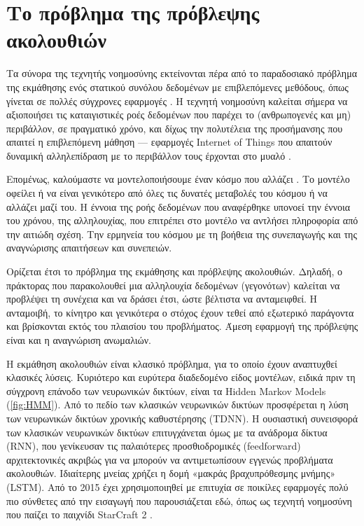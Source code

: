 \section{Το πρόβλημα της πρόβλεψης ακολουθιών}

	Τα σύνορα της τεχνητής νοημοσύνης εκτείνονται πέρα από το παραδοσιακό πρόβλημα της εκμάθησης ενός στατικού συνόλου δεδομένων με επιβλεπόμενες μεθόδους,
	όπως γίνεται σε πολλές σύγχρονες εφαρμογές \parencite{lecun}.
	Η τεχνητή νοημοσύνη καλείται σήμερα να αξιοποιήσει τις καταιγιστικές ροές δεδομένων που παρέχει το (ανθρωπογενές και μη) περιβάλλον, σε πραγματικό χρόνο,
	και δίχως την πολυτέλεια της προσήμανσης που απαιτεί η επιβλεπόμενη μάθηση ---
	εφαρμογές Internet of Things που απαιτούν δυναμική αλληλεπίδραση με το περιβάλλον τους έρχονται στο μυαλό \parencite{mohammadiDeepLearningIoT2018}.

	Επομένως, καλούμαστε να μοντελοποιήσουμε έναν κόσμο που αλλάζει \parencite{staticbottleneck}.
	Το μοντέλο οφείλει ή να είναι γενικότερο από όλες τις δυνατές μεταβολές του κόσμου ή να αλλάζει μαζί του.
	Η έννοια της ροής δεδομένων που αναφέρθηκε υπονοεί την έννοια του χρόνου, της αλληλουχίας, που επιτρέπει στο μοντέλο να αντλήσει πληροφορία από την αιτιώδη σχέση.
	Την ερμηνεία του κόσμου με τη βοήθεια της συνεπαγωγής και της αναγνώρισης απαιτήσεων και συνεπειών.

	Ορίζεται έτσι το πρόβλημα της εκμάθησης και πρόβλεψης ακολουθιών.
	Δηλαδή, ο πράκτορας που παρακολουθεί μια αλληλουχία δεδομένων (γεγονότων) καλείται να προβλέψει τη συνέχεια και να δράσει έτσι, ώστε βέλτιστα να ανταμειφθεί.
	Η ανταμοιβή, το κίνητρο και γενικότερα ο στόχος έχουν τεθεί από εξωτερικό παράγοντα και βρίσκονται εκτός του πλαισίου του προβλήματος.
	Άμεση εφαρμογή της πρόβλεψης είναι και η αναγνώριση ανωμαλιών.

	Η εκμάθηση ακολουθιών είναι κλασικό πρόβλημα, για το οποίο έχουν αναπτυχθεί κλασικές λύσεις.
	Κυριότερο και ευρύτερα διαδεδομένο είδος μοντέλων, ειδικά πριν τη σύγχρονη επάνοδο των νευρωνικών δικτύων, είναι τα Hidden Markov Models (\ref{fig:HMM}).
	Από το πεδίο των κλασικών νευρωνικών δικτύων προσφέρεται η λύση των νευρωνικών δικτύων χρονικής καθυστέρησης (TDNN).
	Η ουσιαστική συνεισφορά των κλασικών νευρωνικών δικτύων επιτυγχάνεται όμως με τα ανάδρομα δίκτυα (RNN),
	που γενίκευσαν τις παλαιότερες προσθιοδρομικές (feedforward) αρχιτεκτονικές ακριβώς για να μπορούν να αντιμετωπίσουν εγγενώς προβλήματα ακολουθιών.
	Ιδιαίτερης μνείας χρήζει η δομή «μακράς βραχυπρόθεσμης μνήμης» (LSTM).
	Από το 2015 έχει χρησιμοποιηθεί με επιτυχία σε ποικίλες εφαρμογές πολύ πιο σύνθετες από την εισαγωγή που παρουσιάζεται εδώ,
	όπως ως τεχνητή νοημοσύνη που παίζει το παιχνίδι StarCraft 2 \parencite[AlphaStar][]{vinyalsAlphaStarMasteringRealTime2019}.

